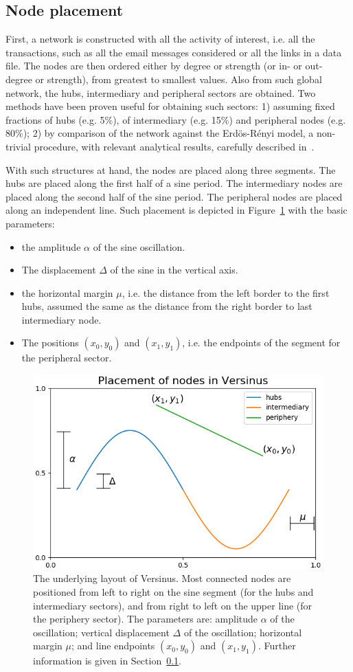 \documentclass[runningheads]{llncs}
\begin{document}
\subsection{Node placement}\label{sec:pla}
First, a network is constructed with all the activity of interest, i.e. all the transactions, such as all the email messages considered or all the links in a data file.
The nodes are then ordered either by degree or strength (or in- or out- degree or strength), from greatest to smallest values.
Also from such global network, the hubs, intermediary and peripheral sectors are obtained. Two methods have been proven useful for obtaining such sectors: 1) assuming fixed fractions of hubs (e.g. 5\%), of intermediary (e.g. 15\%) and peripheral nodes (e.g. 80\%); 2) by comparison of the network against the Erdös-Rényi model, a non-trivial procedure, with relevant analytical results, carefully described in~\cite{stab}.

With such structures at hand, the nodes are placed along three segments.
The hubs are placed along the first half of a sine period.
The intermediary nodes are placed along the second half of the sine period.
The peripheral nodes are placed along an independent line.
Such placement is depicted in Figure~\ref{fig:glob} with
the basic parameters:
\begin{itemize}
  \item the amplitude $\alpha$ of the sine oscillation.
  \item The displacement $\Delta$ of the sine in the vertical axis.
  \item the horizontal margin $\mu$, i.e. the distance from the left border to the first hubs, assumed the same as the distance from the right border to last intermediary node.
  \item The positions $(x_0,y_0)$ and $(x_1,y_1)$, i.e. the endpoints of the segment for the peripheral sector.
\end{itemize}

\begin{figure}[!h]\centering
\includegraphics[width=.7\textwidth]{nodePositioning}
  \caption{The underlying layout of Versinus. Most connected nodes are positioned from left to right on the sine segment (for the hubs and intermediary sectors), and from right to left on the upper line (for the periphery sector). The parameters are: amplitude $\alpha$ of the oscillation; vertical displacement $\Delta$ of the oscillation; horizontal margin $\mu$; and line endpoints $(x_0, y_0)$ and $(x_1, y_1)$.
   Further information is given in Section~\ref{sec:pla}.
  }\label{fig:glob}
\end{figure}
\end{document}
